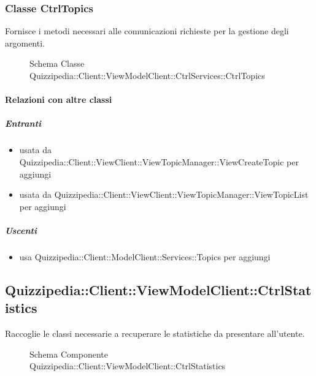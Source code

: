 \subsubsection{Classe CtrlTopics}
Fornisce i metodi necessari alle comunicazioni richieste per la gestione degli argomenti.
\begin{figure}[H]
\centering
\noindent{}
\caption[Schema Classe CtrlTopics]{Schema Classe Quizzipedia::Client::ViewModelClient::CtrlServices::CtrlTopics}
\end{figure}
\paragraph{Relazioni con altre classi}
\subparagraph{Entranti}
\begin{itemize}
\item usata da Quizzipedia::Client::ViewClient::ViewTopicManager::ViewCreateTopic per aggiungi
\item usata da Quizzipedia::Client::ViewClient::ViewTopicManager::ViewTopicList per aggiungi
\end{itemize}
\subparagraph{Uscenti}
\begin{itemize}
\item usa Quizzipedia::Client::ModelClient::Services::Topics per aggiungi
\end{itemize}
\subsection{Quizzipedia::Client::ViewModelClient::CtrlStatistics}
Raccoglie le classi necessarie a recuperare le statistiche da presentare all'utente.
\begin{figure}[H]
\centering
\noindent{}
\caption[Schema Componente Quizzipedia::Client::ViewModelClient::CtrlStatistics]{Schema Componente Quizzipedia::Client::ViewModelClient::CtrlStatistics}
\end{figure}
